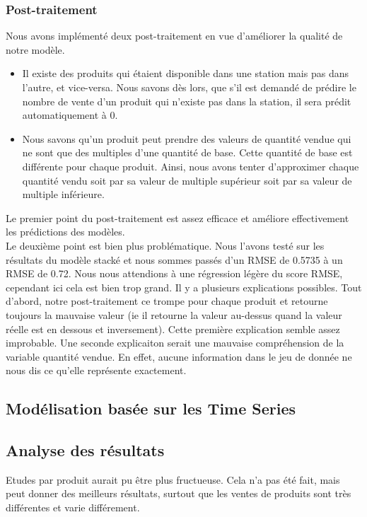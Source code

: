 \documentclass{article} %
\begin{document}
\subsubsection{Post-traitement}
Nous avons implémenté deux post-traitement en vue d'améliorer la qualité de notre modèle.
\begin{itemize}
	\item Il existe des produits qui étaient disponible dans une station mais pas dans l'autre, et vice-versa. Nous savons dès lors, que s'il est demandé de prédire le nombre de vente d'un produit qui n'existe pas dans la station, il sera prédit automatiquement à 0.
	\item Nous savons qu'un produit peut prendre des valeurs de quantité vendue qui ne sont que des multiples d'une quantité de base. Cette quantité de base est différente pour chaque produit. Ainsi, nous avons tenter d'approximer chaque quantité vendu soit par sa valeur de multiple supérieur soit par sa valeur de multiple inférieure. 
\end{itemize}
Le premier point du post-traitement est assez efficace et améliore effectivement les prédictions des modèles.\\
Le deuxième point est bien plus problématique. Nous l'avons testé  sur les résultats du modèle stacké et nous sommes passés d'un RMSE de 0.5735 à un RMSE de 0.72. Nous nous attendions à une régression légère du score RMSE, cependant ici cela est bien trop grand. Il y a plusieurs explications possibles. Tout d'abord, notre post-traitement ce trompe pour chaque produit et retourne toujours la mauvaise valeur (ie il retourne la valeur au-dessus quand la valeur réelle est en dessous et inversement). Cette première explication semble assez improbable. Une seconde explicaiton serait une mauvaise compréhension de la variable quantité vendue. En effet, aucune information dans le jeu de donnée ne nous dis ce qu'elle représente exactement.


\subsection{Modélisation basée sur les Time Series}
\label{sec:tm}


\newpage
\subsection{Analyse des résultats}
Etudes par produit aurait pu être plus fructueuse. Cela n'a pas été fait, mais peut donner des meilleurs résultats, surtout que les ventes de produits sont très différentes et varie différement. 
\newpage
\end{document}
